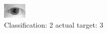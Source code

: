 \begin{figure}[h!]
\begin{center}
\includegraphics[width=0.60\columnwidth]{figures/ID1122_class_2_target_3.png}
\end{center}
\caption{ Classification: 2 actual target: 3}
\label{fig:ID1122_class_2_target_3}
\end{figure}
